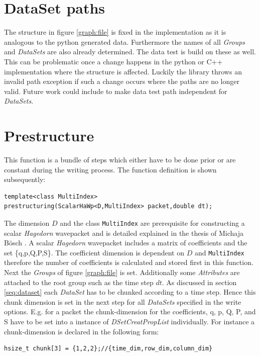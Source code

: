 \section{DataSet paths}
The structure in figure \ref{graph:file} is fixed in the implementation as it is analogous to the python generated data. Furthermore the names of all \textit{Groups} and \textit{DataSets} are also already determined. The data test is build on these as well. This can be problematic once a change happens in the python or C++ implementation where the structure is affected. Luckily the library throws an invalid path exception if such a change occurs where the paths are no longer valid. Future work could include to make data test path independent for \textit{DataSets}.

\section{Prestructure}
\label{seq:prestructure}
This function is a bundle of steps which either have to be done prior or are constant during the writing process. The function definition is shown subsequently:
\begin{lstlisting}
template<class MultiIndex>
prestructuring(ScalarHaWp<D,MultiIndex> packet,double dt);
\end{lstlisting}
The dimension $D$ and the class \texttt{MultiIndex} are prerequisite for constructing a scalar \textit{Hagedorn} wavepacket and is detailed explained in the thesis of Michaja B\"osch \cite{bt_michajab}. A scalar \textit{Hagedorn} wavepacket includes a matrix of coefficients and the set \{q,p,Q,P,S\}. The coefficient dimension is dependent on $D$ and \texttt{MultiIndex} therefore the number of coefficients is calculated and stored first in this function. Next the \textit{Groups} of figure \ref{graph:file} is set. Additionally some \textit{Attributes} are attached to the root group such as the time step $dt$. As discussed in section \ref{seq:dataset} each \textit{DataSet} has to be chunked according to a time step. Hence this chunk dimension is set in the next step for all \textit{DataSets} specified in the write options. E.g. for a packet the chunk-dimension for the coefficients, q, p, Q, P, and S have to be set into a instance of \textit{DSetCreatPropList} individually. 
For instance a chunk-dimension is declared in the following form:
\begin{lstlisting}
hsize_t chunk[3] = {1,2,2};//{time_dim,row_dim,column_dim}
\end{lstlisting}
